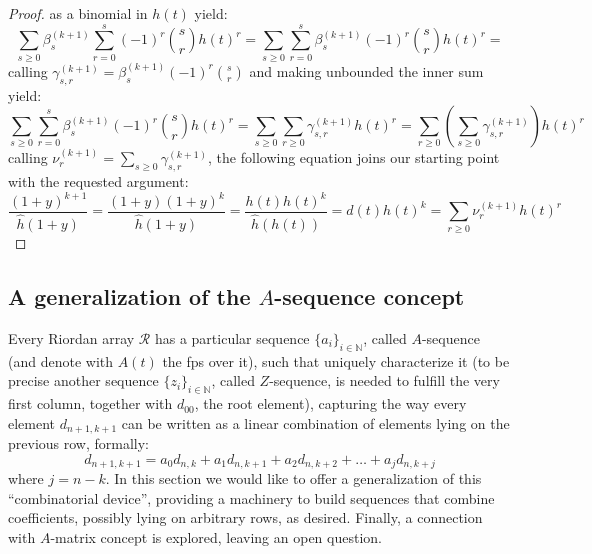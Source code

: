 \documentclass[11pt,a4paper]{article} %
\begin{document}
\begin{proof}
    as a binomial in $h(t)$ yield:
    \begin{displaymath}
        \sum_{s\geq 0}{\beta_{s}^{(k+1)} {\sum_{r=0}^{s}{(-1)^{r}{{s}\choose{r}} h(t)^{r}}}} =
        \sum_{s\geq 0}{ \sum_{r=0}^{s}{\beta_{s}^{(k+1)}(-1)^{r}{{s}\choose{r}} h(t)^{r}}} =
    \end{displaymath}
    calling $\gamma_{s,r}^{(k+1)}=\beta_{s}^{(k+1)}(-1)^{r}{{s}\choose{r}}$ and making 
    unbounded the inner sum yield: 
    \begin{displaymath}
        \sum_{s\geq 0}{ \sum_{r=0}^{s}{\beta_{s}^{(k+1)}(-1)^{r}{{s}\choose{r}} h(t)^{r}}} =
        \sum_{s\geq 0}{ \sum_{r\geq 0}{\gamma_{s,r}^{(k+1)} h(t)^{r}}} =
        \sum_{r\geq 0}{ \left(\sum_{s\geq 0}{\gamma_{s,r}^{(k+1)} }\right) h(t)^{r}}
    \end{displaymath}
    calling $\nu_{r}^{(k+1)}=\sum_{s\geq 0}{\gamma_{s,r}^{(k+1)} }$, the following equation
    joins our starting point with the requested argument:
    \begin{displaymath}
        \frac{(1+y)^{k+1}}{ \hat{h}(1+y)} = 
        \frac{(1+y)(1+y)^{k}}{ \hat{h}(1+y)} = 
        \frac{h(t)h(t)^{k}}{ \hat{h}(h(t))} = 
        d(t)h(t)^{k} = \sum_{r\geq 0}{ \nu_{r}^{(k+1)} h(t)^{r}}
    \end{displaymath}

    \end{proof}

    \subsection{A generalization of the $A$-sequence concept}

    Every Riordan array $\mathcal{R}$ has a particular sequence 
    $\lbrace a_i\rbrace_{i\in\mathbb{N}}$,
    called $A$-sequence (and denote with $A(t)$ the fps over it),
    such that uniquely characterize it (to be precise another sequence
    $\lbrace z_i\rbrace_{i\in\mathbb{N}}$, called $Z$-sequence, is needed 
    to fulfill the very first column, together with $d_{00}$, the root element), 
    capturing the way every element $d_{n+1,k+1}$ can be written as a linear combination
    of elements lying on the previous row, formally:
    \begin{displaymath}
        d_{n+1,k+1} = a_{0}d_{n,k} +a_{1}d_{n,k+1} +a_{2}d_{n,k+2} + 
            \ldots + a_{j}d_{n,k+j}
    \end{displaymath}
    where $j = n-k$. In this section we would like to offer a generalization
    of this ``combinatorial device'', providing a machinery to build sequences 
    that combine coefficients, possibly lying on arbitrary rows, as desired.
    Finally, a connection with $A$-matrix concept is explored, leaving an open 
    question.
\end{document}
